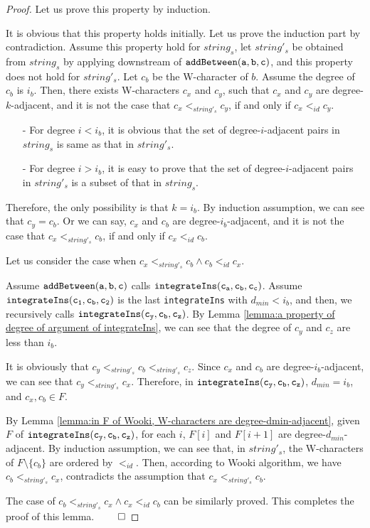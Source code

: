 \begin {proof}
Let us prove this property by induction.

It is obvious that this property holds initially. Let us prove the induction part by contradiction. Assume this property hold for $string_s$, let $string'_s$ be obtained from $string_s$ by applying downstream of $\alabelshort[{\tt addBetween}]{a,b,c}$, and this property does not hold for $string'_s$. Let $c_b$ be the W-character of $b$. Assume the degree of $c_b$ is $i_b$. Then, there exists W-characters $c_x$ and $c_y$, such that $c_x$ and $c_y$ are degree-$k$-adjacent, and it is not the case that $c_x <_{string'_s} c_y$, if and only if $c_x <_{id} c_y$.

\begin{itemize}
\setlength{\itemsep}{0.5pt}
\item[-] For degree $i<i_b$, it is obvious that the set of degree-$i$-adjacent pairs in $string_s$ is same as that in $string'_s$.

\item[-] For degree $i>i_b$, it is easy to prove that the set of degree-$i$-adjacent pairs in $string'_s$ is a subset of that in $string_s$.
\end{itemize}

Therefore, the only possibility is that $k=i_b$. By induction assumption, we can see that $c_y = c_b$. Or we can say, $c_x$ and $c_b$ are degree-$i_b$-adjacent, and it is not the case that $c_x <_{string'_s} c_b$, if and only if $c_x <_{id} c_b$.

Let us consider the case when $c_x <_{string'_s} c_b \wedge c_b <_{id} c_x$.

Assume $\alabelshort[{\tt addBetween}]{a,b,c}$ calls $\alabelshort[{\tt integrateIns}]{c_a,c_b,c_c}$. Assume $\alabelshort[{\tt integrateIns}]{c_1,c_b,c_2}$ is the last {\tt integrateIns} with $d_{min} < i_b$, and then, we recursively calls $\alabelshort[{\tt integrateIns}]{c_y,c_b,c_z}$. By Lemma \ref{lemma:a property of degree of argument of integrateIns}, we can see that the degree of $c_y$ and $c_z$ are less than $i_b$.

It is obviously that $c_y <_{string'_s} c_b <_{string'_s} c_z$. Since $c_x$ and $c_b$ are degree-$i_b$-adjacent, we can see that $c_y <_{string'_s} c_x$. Therefore, in $\alabelshort[{\tt integrateIns}]{c_y,c_b,c_z}$, $d_{min} = i_b$, and $c_x,c_b \in F$.

By Lemma \ref{lemma:in F of Wooki, W-characters are degree-dmin-adjacent}, given $F$ of $\alabelshort[{\tt integrateIns}]{c_y,c_b,c_z}$, for each $i$, $F[i]$ and $F[i+1]$ are degree-$d_{min}$-adjacent. By induction assumption, we can see that, in $string'_s$, the W-characters of $F \setminus \{ c_b \}$ are ordered by $<_{id}$. Then, according to Wooki algorithm, we have $c_b <_{string'_s} c_x$, contradicts the assumption that $c_x <_{string'_s} c_b$.

The case of $c_b <_{string'_s} c_x \wedge c_x <_{id} c_b$ can be similarly proved. This completes the proof of this lemma. $\qed$
\end {proof}


